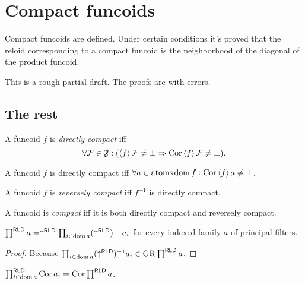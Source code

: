 \chapter{Compact funcoids}

Compact funcoids are defined. Under certain conditions it's proved that the
reloid corresponding to a compact funcoid is the neighborhood of the diagonal
of the product funcoid.

This is a rough partial draft. The proofs are with errors.

\section{The rest}

\begin{defn}
  A funcoid $f$ is \emph{directly compact} iff
  \[ \text{$\forall \mathcal{F} \in \mathfrak{F}: (\left\langle f\right\rangle
     \mathcal{F} \neq \bot \Rightarrow \operatorname{Cor} \left\langle f\right\rangle \mathcal{F}
     \neq \bot)$.} \]
\end{defn}

\begin{obvious}
A funcoid $f$ is directly compact iff $\forall a \in \operatorname{atoms} \operatorname{dom} f :
\operatorname{Cor} \left\langle f\right\rangle a \neq \bot$.
\end{obvious}

\begin{defn}
  A funcoid $f$ is \emph{reversely compact} iff $f^{- 1}$ is directly
  compact.
\end{defn}

\begin{defn}
  A funcoid is \emph{compact} iff it is both directly compact and reversely
  compact.
\end{defn}

\begin{prop}
  $\prod^{\mathsf{RLD}} a = \uparrow^{\mathsf{RLD}} \prod_{i \in
  \operatorname{dom} a} (\uparrow^{\mathsf{RLD}})^{- 1} a_i$ for every indexed
  family $a$ of principal filters.
\end{prop}

\begin{proof}
Because $\prod_{i \in \operatorname{dom} a} (\uparrow^{\mathsf{RLD}})^{- 1} a_i
\in \operatorname{GR} \prod^{\mathsf{RLD}} a$.
\end{proof}

\begin{lem}
$\prod^{\mathsf{RLD}}_{i \in \operatorname{dom} a} \operatorname{Cor} a_i = \operatorname{Cor}
\prod^{\mathsf{RLD}} a$.
\end{lem}

